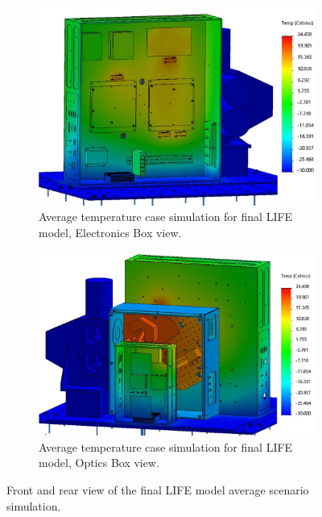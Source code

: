 \begin{figure}
    \centering
    \begin{subfigure}[h]{0.8\textwidth}
        \centering
        \includegraphics[width=\textwidth]{chap3_images/LIFE_V5_final_images/Iteration_2_ebox_no_labels_FIXED.png}
        \caption{Average temperature case simulation for final LIFE model, Electronics Box view.}
        \label{fig:LIFE_V5_FINAL_TA_AVG_EBOX}
    \end{subfigure}
    \begin{subfigure}[h]{0.8\textwidth}
        \centering
        \includegraphics[width=\textwidth]{chap3_images/LIFE_V5_final_images/Iteration_2_no_labels_FIXED.png}
        \caption{Average temperature case simulation for final LIFE model, Optics Box view.}
        \label{fig:LIFE_V5_FINAL_TA_AVG_OBOX}
    \end{subfigure}
    \caption{Front and rear view of the final LIFE model average scenario simulation.}
    \label{LIFE_V5_FINAL_TA_AVG}
\end{figure}

